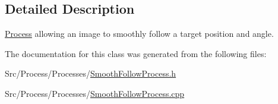 \subsection{Detailed Description}
\hyperlink{classProcess}{Process} allowing an image to smoothly follow a target position and angle. 

The documentation for this class was generated from the following files\-:\begin{DoxyCompactItemize}
\item 
Src/\-Process/\-Processes/\hyperlink{SmoothFollowProcess_8h}{Smooth\-Follow\-Process.\-h}\item 
Src/\-Process/\-Processes/\hyperlink{SmoothFollowProcess_8cpp}{Smooth\-Follow\-Process.\-cpp}\end{DoxyCompactItemize}
